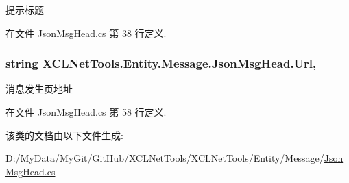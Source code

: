 提示标题 



在文件 Json\-Msg\-Head.\-cs 第 38 行定义.

\hypertarget{class_x_c_l_net_tools_1_1_entity_1_1_message_1_1_json_msg_head_a30c01b95d9a0854dec4af920541f3320}{
\subsubsection[{Url}]{\setlength{\rightskip}{0pt plus 5cm}string X\-C\-L\-Net\-Tools.\-Entity.\-Message.\-Json\-Msg\-Head.\-Url\hspace{0.3cm}{\ttfamily [get]}, {\ttfamily [set]}}}\label{class_x_c_l_net_tools_1_1_entity_1_1_message_1_1_json_msg_head_a30c01b95d9a0854dec4af920541f3320}


消息发生页地址 



在文件 Json\-Msg\-Head.\-cs 第 58 行定义.



该类的文档由以下文件生成\-:\begin{DoxyCompactItemize}
\item 
D\-:/\-My\-Data/\-My\-Git/\-Git\-Hub/\-X\-C\-L\-Net\-Tools/\-X\-C\-L\-Net\-Tools/\-Entity/\-Message/\hyperlink{_json_msg_head_8cs}{Json\-Msg\-Head.\-cs}\end{DoxyCompactItemize}
